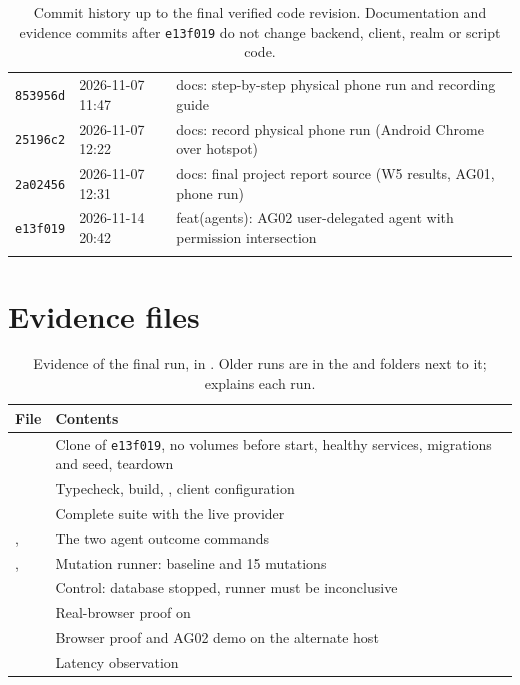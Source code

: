 \begin{longtable}{@{}P{1.5cm} P{2.6cm} P{9.8cm}@{}}
\texttt{853956d} & 2026-11-07 11:47 & docs: step-by-step physical phone run and recording guide\\
\texttt{25196c2} & 2026-11-07 12:22 & docs: record physical phone run (Android Chrome over hotspot)\\
\texttt{2a02456} & 2026-11-07 12:31 & docs: final project report source (W5 results, AG01, phone run)\\
\texttt{e13f019} & 2026-11-14 20:42 & feat(agents): AG02 user-delegated agent with permission intersection\\
\bottomrule
\caption{Commit history up to the final verified code revision. Documentation and evidence commits after \texttt{e13f019} do not change backend, client, realm or script code.}
\end{longtable}

\section{Evidence files}
\label{app:evidence}
\begin{table}[H]
\centering
\small
\begin{tabularx}{\textwidth}{@{}P{4.4cm} L@{}}
\toprule
\textbf{File} & \textbf{Contents}\\
\midrule
{} & Clone of \texttt{e13f019}, no volumes before start, healthy services, migrations and seed, teardown\\
 & Typecheck, build, , client configuration\\
 & Complete suite with the live provider\\
,  & The two agent outcome commands\\
,  & Mutation runner: baseline and 15 mutations\\
 & Control: database stopped, runner must be inconclusive\\
 & Real-browser proof on \\
 & Browser proof and AG02 demo on the alternate host\\
 & Latency observation\\
\bottomrule
\end{tabularx}
\caption{Evidence of the final run, in . Older runs are in the  and  folders next to it;  explains each run.}
\end{table}

